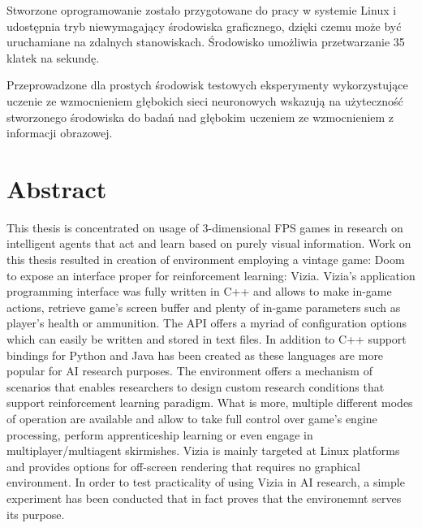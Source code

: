 Stworzone oprogramowanie zostało przygotowane do pracy w systemie Linux i udostępnia tryb niewymagający środowiska graficznego, dzięki czemu może być uruchamiane na zdalnych stanowiskach.
Środowisko umożliwia przetwarzanie 35 klatek na sekundę.

Przeprowadzone dla prostych środowisk testowych eksperymenty wykorzystujące uczenie ze wzmocnieniem głębokich sieci neuronowych wskazują na użyteczność stworzonego środowiska do badań nad głębokim uczeniem ze wzmocnieniem z informacji obrazowej.


\chapter*{Abstract}
This thesis is concentrated on usage of 3-dimensional FPS games in research on intelligent agents that act and learn based on purely visual information. Work on this thesis resulted in creation of environment employing a vintage game: Doom to expose an interface proper for reinforcement learning: Vizia. Vizia's application programming interface was fully written in C++ and allows to make in-game actions, retrieve game's screen buffer and plenty of in-game parameters such as player's health or ammunition. The API offers a myriad of configuration options which can easily be written and stored in text files. In addition to C++ support bindings for Python and Java has been created as these languages are more popular for AI research purposes. The environment offers a mechanism of scenarios that enables researchers to design custom research conditions that support reinforcement learning paradigm. What is more, multiple different modes of operation are available and allow to take full control over game's engine processing, perform apprenticeship learning or even engage in multiplayer/multiagent skirmishes. Vizia is mainly targeted at Linux platforms and provides options for off-screen rendering that requires no graphical environment. In order to test practicality of using Vizia in AI research, a simple experiment has been conducted that in fact proves that the environemnt serves its purpose.
